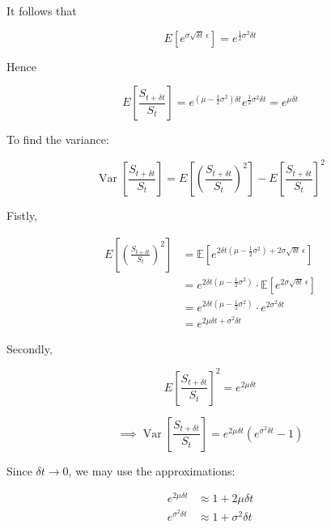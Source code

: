\documentclass{article}
\begin{document}
    It follows that

    \[E\!\left[e^{\sigma \sqrt{\delta t} \, \epsilon}\right] = e^{\frac{1}{2} \sigma^2 \delta t} \]

    Hence

    \begin{equation}
        \label{ev_bintree_dt}
        E\!\left[\frac{S_{t+\delta t}}{S_t}\right] = e^{\left( \mu - \frac{1}{2} \sigma^2 \right) \delta t} e^{\frac{1}{2} \sigma^2 \delta t} = e^{\mu \delta t}
    \end{equation}

    \bigskip

    To find the variance:

    \[\operatorname{Var}\left[\frac{S_{t+\delta t}}{S_t}\right] = E\!\left[\left(\frac{S_{t+\delta t}}{S_t}\right)^2\right] - E\!\left[\frac{S_{t+\delta t}}{S_t}\right]^2\]

    \bigskip

    Fistly,

    \begin{align*}
        E\left[\left(\frac{S_{t+\delta t}}{S_t}\right)^2\right]
        &= \mathbb{E}\!\left[ e^{ 2 \delta t\left( \mu - \frac{1}{2} \sigma^2 \right) + 2 \sigma \sqrt{\delta t} \, \epsilon} \right] \\
        &= e^{2 \delta t\left( \mu - \frac{1}{2} \sigma^2 \right)} \cdot \mathbb{E}\!\left[e^{2 \sigma \sqrt{\delta t} \, \epsilon}\right] \\
        &= e^{2 \delta t\left( \mu - \frac{1}{2} \sigma^2 \right)} \cdot e^{2 \sigma^2 \delta t} \\
        &= e^{2 \mu \delta t + \sigma^2 \delta t}
    \end{align*}

    Secondly,

    \[E\left[\frac{S_{t+\delta t}}{S_t}\right]^2 = e^{2 \mu \delta t}\]

    \bigskip

    \[\implies \operatorname{Var}\left[\frac{S_{t+\delta t}}{S_t}\right] = e^{2 \mu \delta t} (e^{\sigma^2 \delta t} - 1)\]

    Since $\delta t \to 0$, we may use the approximations:

    \begin{align*}
        e^{2 \mu \delta t} &\approx 1 + 2 \mu \delta t \\
        e^{\sigma^2 \delta t} &\approx 1 + \sigma^2 \delta t
    \end{align*}
\end{document}
